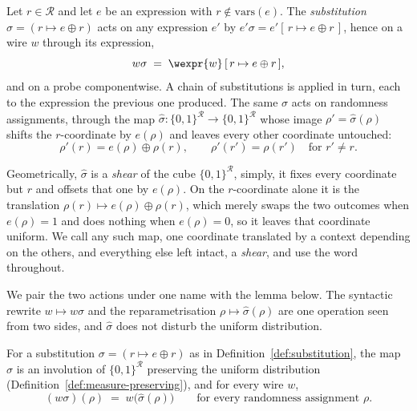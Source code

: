\begin{definition}
\label{def:substitution}
Let $r \in \mathcal{R}$ and let $e$ be an expression with
$r \notin \mathrm{vars}(e)$. The \emph{substitution}
$\sigma = (r \mapsto e \oplus r)$ acts on any expression $e'$ by
$e'\sigma = e'[\,r \mapsto e \oplus r\,]$, hence on a wire $w$ through its expression,
\[
  w\sigma \;=\; \wexpr{w}\,[\,r \mapsto e \oplus r\,] ,
\]
and on a probe componentwise. A chain of substitutions is applied in turn, each to
the expression the previous one produced. The same $\sigma$ acts on randomness assignments,
through the map $\widehat{\sigma} : \{0,1\}^{\mathcal{R}} \to
\{0,1\}^{\mathcal{R}}$ whose image $\rho' = \widehat{\sigma}(\rho)$ shifts the
$r$-coordinate by $e(\rho)$ and leaves every other coordinate untouched:
\[
  \rho'(r) = e(\rho) \oplus \rho(r), \qquad
  \rho'(r') = \rho(r') \quad \text{for } r' \neq r .
\]
\end{definition}

Geometrically, $\widehat{\sigma}$ is a \emph{shear} of the cube
$\{0,1\}^{\mathcal{R}}$, simply, it fixes every coordinate but $r$ and offsets that one
by $e(\rho)$. On the $r$-coordinate alone it is the translation
$\rho(r) \mapsto e(\rho) \oplus \rho(r)$, which merely swaps the two outcomes when
$e(\rho) = 1$ and does nothing when $e(\rho) = 0$, so it leaves that coordinate
uniform. We call any such map, one coordinate translated by a context
depending on the others, and everything else left intact, a \emph{shear}, and use
the word throughout.

We pair the two actions under one name with the lemma below. The
syntactic rewrite $w \mapsto w\sigma$ and the reparametrisation
$\rho \mapsto \widehat{\sigma}(\rho)$ are one operation seen from two sides, and
$\widehat{\sigma}$ does not disturb the uniform distribution.

\begin{lemma}[Substitution]
\label{lem:substitution}
For a substitution $\sigma = (r \mapsto e \oplus r)$ as in
Definition~\ref{def:substitution}, the map $\widehat{\sigma}$ is an involution of
$\{0,1\}^{\mathcal{R}}$ preserving the uniform distribution
(Definition~\ref{def:measure-preserving}), and for every wire $w$,
\[
  (w\sigma)(\rho) \;=\; w\big(\widehat{\sigma}(\rho)\big)
  \qquad \text{for every randomness assignment } \rho .
\]
\end{lemma}

